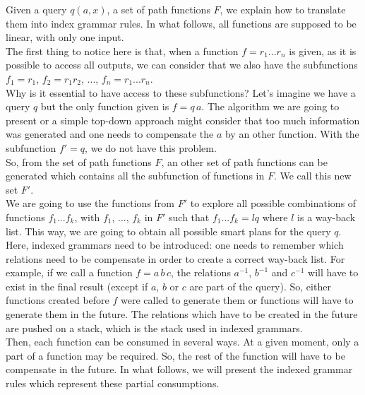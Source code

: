 Given a query $q(a,x)$, a set of path functions $F$, we explain how to translate them into index grammar rules. In what follows, all functions are supposed to be linear, with only one input.\\

The first thing to notice here is that, when a function $f = r_1 ... r_n$ is given, as it is possible to access all outputs, we can consider that we also have the subfunctions $f_1 = r_1$, $f_2 = r_1 r_2$, ..., $f_n = r_1 ... r_n$.\\

Why is it essential to have access to these subfunctions? Let's imagine we have a query $q$ but the only function given is $f = q \, a$. The algorithm we are going to present or a simple top-down approach might consider that too much information was generated and one needs to compensate the $a$ by an other function. With the subfunction $f' = q$, we do not have this problem.\\

So, from the set of path functions $F$, an other set of path functions can be generated which contains all the subfunction of functions in $F$. We call this new set $F'$.\\

We are going to use the functions from $F'$ to explore all possible combinations of functions $f_1 ... f_k$, with $f_1$, ..., $f_k$ in $F'$ such that $f_1 ... f_k = lq$ where $l$ is a way-back list. This way, we are going to obtain all possible smart plans for the query $q$.\\

Here, indexed grammars need to be introduced: one needs to remember which relations need to be compensate in order to create a correct way-back list. For example, if we call a function $f = a \, b \, c$, the relations $a^{-1}$, $b^{-1}$ and $c^{-1}$ will have to exist in the final result (except if $a$, $b$ or $c$ are part of the query). So, either functions created before $f$ were called to generate them or functions will have to generate them in the future. The relations which have to be created in the future are pushed on a stack, which is the stack used in indexed grammars.\\

Then, each function can be consumed in several ways. At a given moment, only a part of a function may be required. So, the rest of the function will have to be compensate in the future. In what follows, we will present the indexed grammar rules which represent these partial consumptions.


